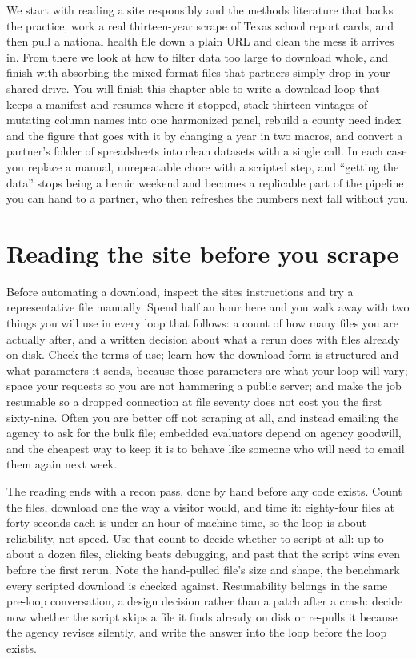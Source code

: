 \documentclass[
    a4paper,
    fontsize=10pt,
    twoside=true,
    numbers=noenddot,
]{kaobook}
\begin{document}
We start with reading a site responsibly and the methods literature that backs the practice, work a real thirteen-year scrape of Texas school report cards, and then pull a national health file down a plain URL and clean the mess it arrives in. From there we look at how to filter data too large to download whole, and finish with absorbing the mixed-format files that partners simply drop in your shared drive. You will finish this chapter able to write a download loop that keeps a manifest and resumes where it stopped, stack thirteen vintages of mutating column names into one harmonized panel, rebuild a county need index and the figure that goes with it by changing a year in two macros, and convert a partner's folder of spreadsheets into clean datasets with a single call. In each case you replace a manual, unrepeatable chore with a scripted step, and \enquote{getting the data} stops being a heroic weekend and becomes a replicable part of the pipeline you can hand to a partner, who then refreshes the numbers next fall without you.

\section{Reading the site before you scrape}
Before automating a download, inspect the site\textquotesingle s instructions and try a representative file manually. Spend half an hour here and you walk away with two things you will use in every loop that follows: a count of how many files you are actually after, and a written decision about what a rerun does with files already on disk. Check the terms of use; learn how the download form is structured and what parameters it sends, because those parameters are what your loop will vary; space your requests so you are not hammering a public server; and make the job resumable so a dropped connection at file seventy does not cost you the first sixty-nine. Often you are better off not scraping at all, and instead emailing the agency to ask for the bulk file; embedded evaluators depend on agency goodwill, and the cheapest way to keep it is to behave like someone who will need to email them again next week.

The reading ends with a recon pass, done by hand before any code exists. Count the files, download one the way a visitor would, and time it: eighty-four files at forty seconds each is under an hour of machine time, so the loop is about reliability, not speed. Use that count to decide whether to script at all: up to about a dozen files, clicking beats debugging, and past that the script wins even before the first rerun. Note the hand-pulled file's size and shape, the benchmark every scripted download is checked against. Resumability belongs in the same pre-loop conversation, a design decision rather than a patch after a crash: decide now whether the script skips a file it finds already on disk or re-pulls it because the agency revises silently, and write the answer into the loop before the loop exists.
\end{document}
